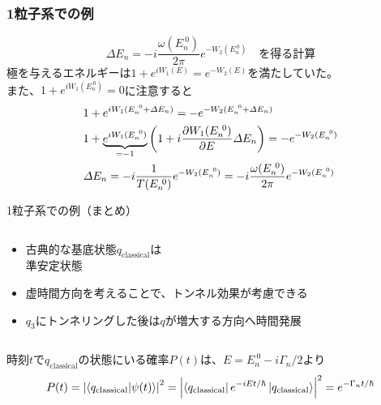 \documentclass[14pt,aspectratio=169,xcolor=dvipsnames,table,dvipdfmx]{beamer}
\theoremstyle{definition}
\begin{document}
\begin{frame}
  \frametitle{1粒子系での例}
  \begin{equation*}
    \varDelta E_n = -i\frac{\omega(E_n^{~0})}{2\pi}e^{-W_2(E_n^{~0})}\quad\text{を得る計算}
  \end{equation*}
  極を与えるエネルギーは$1+e^{iW_1(E)}=e^{-W_2(E)}$を満たしていた。\\
  また、$1+e^{iW_1(E_n^{~0})}=0$に注意すると
  \begin{align*}
     & 1+e^{iW_1(E_n^{~0}+\varDelta E_n)}=-e^{-W_2(E_n^{~0}+\varDelta E_n)}                                          \\
     & 1+\underbrace{e^{iW_1(E_n^{~0})}}_{=-1}\qty(1+i\pdv{W_1(E_n^{~0})}{E}\varDelta E_n) = -e^{-W_2(E_n^{~0})}     \\
     & \varDelta E_n = -i\frac{1}{T(E_n^{~0})}e^{-W_2(E_n^{~0})} = -i\frac{\omega(E_n^{~0})}{2\pi}e^{-W_2(E_n^{~0})}
  \end{align*}



\end{frame}

\begin{frame}{1粒子系での例（まとめ）}
  \begin{columns}[t]
    \begin{column}{.5\textwidth}
      \begin{itemize}
        \item 古典的な基底状態$q_{\text{classical}}$は\\準安定状態
        \item 虚時間方向を考えることで、トンネル効果が考慮できる
        \item $q_3$にトンネリングした後は$q$が増大する方向へ時間発展
      \end{itemize}
    \end{column}
    \begin{column}{.5\textwidth}
    \end{column}
  \end{columns}
  時刻$t$で$q_{\text{classical}}$の状態にいる確率$P(t)$は、$E=E_n^{~0}-i\Gamma_n/2$より
  \begin{equation*}
    P(t) = \abs{\braket{q_{\text{classical}}}{\psi(t)}}^2 = \abs{\bra{q_{\text{classical}}}e^{-iEt/\hbar}\ket{q_{\text{classical}}}}^2 = e^{-\Gamma_nt/\hbar}
  \end{equation*}
\end{frame}
\end{document}
